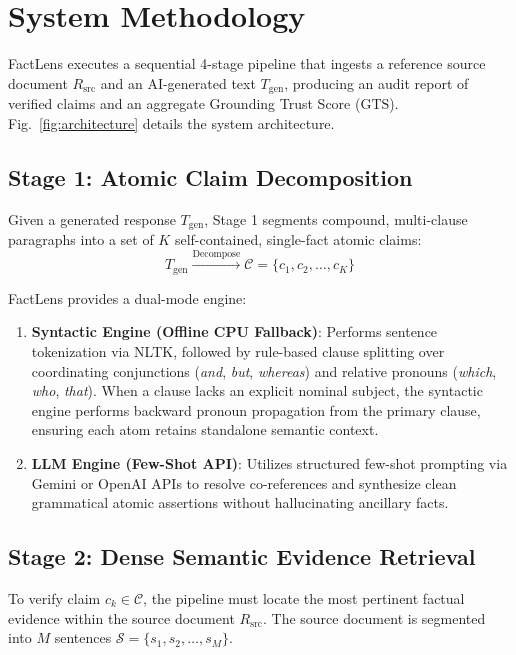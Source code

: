 \documentclass[conference]{IEEEtran}
\begin{document}
\section{System Methodology}
FactLens executes a sequential 4-stage pipeline that ingests a reference source document $R_{\text{src}}$ and an AI-generated text $T_{\text{gen}}$, producing an audit report of verified claims and an aggregate Grounding Trust Score ($\text{GTS}$). Fig.~\ref{fig:architecture} details the system architecture.

\subsection{Stage 1: Atomic Claim Decomposition}
Given a generated response $T_{\text{gen}}$, Stage 1 segments compound, multi-clause paragraphs into a set of $K$ self-contained, single-fact atomic claims:
\begin{equation}
T_{\text{gen}} \xrightarrow{\text{Decompose}} \mathcal{C} = \{c_1, c_2, \dots, c_K\}
\end{equation}

FactLens provides a dual-mode engine:
\begin{enumerate}
    \item \textbf{Syntactic Engine (Offline CPU Fallback)}: Performs sentence tokenization via NLTK, followed by rule-based clause splitting over coordinating conjunctions (\textit{and}, \textit{but}, \textit{whereas}) and relative pronouns (\textit{which}, \textit{who}, \textit{that}). When a clause lacks an explicit nominal subject, the syntactic engine performs backward pronoun propagation from the primary clause, ensuring each atom retains standalone semantic context.
    \item \textbf{LLM Engine (Few-Shot API)}: Utilizes structured few-shot prompting via Gemini or OpenAI APIs to resolve co-references and synthesize clean grammatical atomic assertions without hallucinating ancillary facts.
\end{enumerate}

\subsection{Stage 2: Dense Semantic Evidence Retrieval}
To verify claim $c_k \in \mathcal{C}$, the pipeline must locate the most pertinent factual evidence within the source document $R_{\text{src}}$. The source document is segmented into $M$ sentences $\mathcal{S} = \{s_1, s_2, \dots, s_M\}$.
\end{document}
